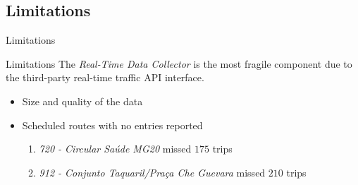 \documentclass[xcolor=dvipsnames,table]{beamer}
\begin{document}
\subsection{Limitations}
\begin{frame}{Limitations}
        \begin{block}{Limitations}
                The {\em Real-Time Data Collector} is the most fragile component due
                to the third-party real-time traffic API interface.
                \begin{itemize}
                        \item Size and quality of the data
                        \item Scheduled routes with no entries reported
                                \begin{enumerate}
                                        \item \textit{720 - Circular Saúde MG20} missed $175$ trips
                                        \item \textit{912 - Conjunto Taquaril/Praça Che Guevara} missed $210$ trips
                                \end{enumerate}
                \end{itemize}

        \end{block}
\end{frame}
\end{document}
